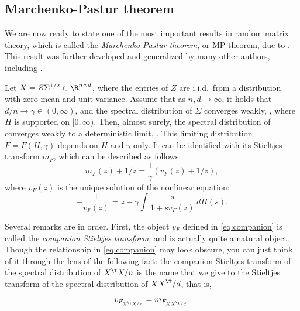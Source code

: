 \documentclass{article}
\begin{document}
\subsection{Marchenko-Pastur theorem}

We are now ready to state one of the most important results in random matrix
theory, which is called the \emph{Marchenko-Pastur theorem}, or MP theorem, due
to \citet{marchenko1967distribution}. This result was further developed and
generalized by many other authors, including \citet{silverstein1995strong}.   

\begin{theorem}
\label{thm:mp}
Let $X = Z \Sigma^{1/2} \in \R^{n \times d}$, where the entries of $Z$ are
i.i.d.\ from a distribution with zero mean and unit variance. Assume that as
$n,d \to \infty$, it holds that $d/n \to \gamma \in (0,\infty)$, and the
spectral distribution of $\Sigma$ converges weakly, ,
where $H$ is supported on $[0,\infty)$. Then, almost surely, the spectral
distribution of  converges weakly to a deterministic
limit, . This limiting distribution $F = F(H,
\gamma)$ depends on $H$ and $\gamma$ only. It can be identified with its
Stieltjes transform $m_F$, which can be described as follows:
\begin{equation}
\label{eq:companion}
m_F(z) + 1/z = \frac{1}{\gamma}(v_F(z) + 1/z),
\end{equation} 
where $v_F(z)$ is the unique solution of the nonlinear equation:
\begin{equation}
\label{eq:silverstein}
-\frac{1}{v_F(z)} = z - \gamma \int \frac{s}{1 + sv_F(z)} \, dH(s).
\end{equation}
\end{theorem}

Several remarks are in order. First, the object $v_F$ defined in
\eqref{eq:companion} is called the \emph{companion Stieltjes transform}, and is
actually quite a natural object. Though the relationship in \eqref{eq:companion}
may look obscure, you can just think of it through the lens of the following
fact: the companion Stieltjes transform of the spectral distribution of $X^\T 
X/n$ is the name that we give to the Stieltjes transform of the spectral
distribution of $XX^\T/d$, that is,  
\[
v_{F_{X^\T X/n}} = m_{F_{XX^\T/d}}.
\]
\end{document}
